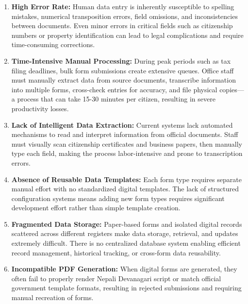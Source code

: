\documentclass[12pt]{report}
\begin{document}
\begin{enumerate}[label=\textbullet, leftmargin=*, nosep, itemsep=3pt, topsep=2pt]
 \item \textbf{High Error Rate:} Human data entry is inherently susceptible to 
   spelling mistakes, numerical transposition errors, field omissions, and 
   inconsistencies between documents. Even minor errors in critical fields such 
   as citizenship numbers or property identification can lead to legal complications 
   and require time-consuming corrections.

 \item \textbf{Time-Intensive Manual Processing:} During peak periods such as tax 
   filing deadlines, bulk form submissions create extensive queues. Office staff 
   must manually extract data from source documents, transcribe information into 
   multiple forms, cross-check entries for accuracy, and file physical copies—a 
   process that can take 15-30 minutes per citizen, resulting in severe productivity 
   losses.

 \item \textbf{Lack of Intelligent Data Extraction:} Current systems lack 
   automated mechanisms to read and interpret information from official documents. 
   Staff must visually scan citizenship certificates and business papers, then 
   manually type each field, making the process labor-intensive and prone to 
   transcription errors.

 \item \textbf{Absence of Reusable Data Templates:} Each form type requires 
   separate manual effort with no standardized digital templates. The lack of 
   structured configuration systems means adding new form types requires significant 
   development effort rather than simple template creation.

 \item \textbf{Fragmented Data Storage:} Paper-based forms and isolated digital 
   records scattered across different registers make data storage, retrieval, and 
   updates extremely difficult. There is no centralized database system enabling 
   efficient record management, historical tracking, or cross-form data reusability.

 \item \textbf{Incompatible PDF Generation:} When digital forms are generated, 
   they often fail to properly render Nepali Devanagari script or match official 
   government template formats, resulting in rejected submissions and requiring 
   manual recreation of forms.


\end{enumerate}
\end{document}
